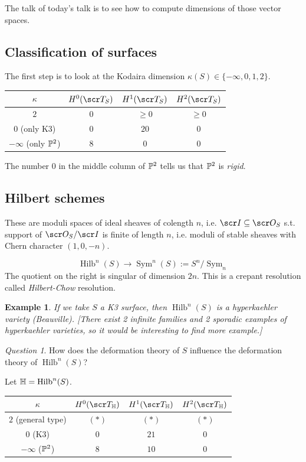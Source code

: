 \documentclass[A4paper, british]{amsart}
\theoremstyle{darkgreentheorem}
\theoremstyle{darkbluedefinition}
\theoremstyle{darkredexample}
\newtheorem{exa}[thm]{Example}
\theoremstyle{remark}
\newtheorem{q}[thm]{Question}
\DeclareMathOperator{\Sym}{Sym}
\DeclareMathOperator{\Hilb}{Hilb}
\newcommand{\1}{\mathbbm{1}}
\newcommand{\sub}{\subseteq}
\begin{document}
The talk of today's talk is to see how to compute dimensions of those vector spaces.

\subsection{Classification of surfaces}

The first step is to look at the Kodaira dimension $\kappa(S)\in \{-\infty,0,1,2\}$.
\begin{center}
    \begin{tabular}{|c|c|c|c|}
	\hline
	$\kappa$ & $H^{0}(\sT_{S})$ & $H^{1}(\sT_{S})$ & $H^{2}(\sT_{S})$ \\
	\hline
	$2$ & $0$ & $\geqslant 0$ & $\geqslant 0$ \\
	$0$ (only K3) & $0$ & $20$ & $0$ \\
	$-\infty$ (only $\P^{2}$) & $8$ & $0$ & $0$ \\
	\hline
    \end{tabular}
\end{center}

The number $0$ in the middle column of $\P^{2}$ tells us that $\P^{2}$ is \textit{rigid}.

\subsection{Hilbert schemes}

These are moduli spaces of ideal sheaves of colength $n$, i.e. $\I\sub \O_{S}$ s.t. support of $\O_{S}/\I$ is finite of length $n$, i.e. moduli of stable sheaves with Chern character $(1,0,-n)$.

\[ \Hilb^{n}(S)\to \Sym^{n}(S):=S^{n}/\Sym_{n} \]
The quotient on the right is singular of dimension $2n$.
This is a crepant resolution called \textit{Hilbert-Chow} resolution.

\begin{exa}
    If we take $S$ a K3 surface, then $\Hilb^{n}(S)$ is a hyperkaehler variety (Beauville).
    [There exist 2 infinite families and 2 sporadic examples of hyperkaehler varieties, so it would be interesting to find more example.]
\end{exa}

\begin{q}
    How does the deformation theory of $S$ influence the deformation theory of $\Hilb^{n}(S)$?
\end{q}

Let $\bbH=\Hilb^{n}(S)$.
\begin{center}
    \begin{tabular}{|c|c|c|c|}
	\hline
	$\kappa$ & $H^{0}(\sT_{\bbH})$ & $H^{1}(\sT_{\bbH})$ & $H^{2}(\sT_{\bbH})$ \\
	\hline
	$2$ (general type) & $(*)$ & $(*)$ & $(*)$ \\
	$0$ (K3) & $0$ & $21$ & $0$ \\
	$-\infty$ ($\P^{2}$) & $8$ & $10$ & $0$ \\
	\hline
    \end{tabular}
\end{center}
\end{document}
